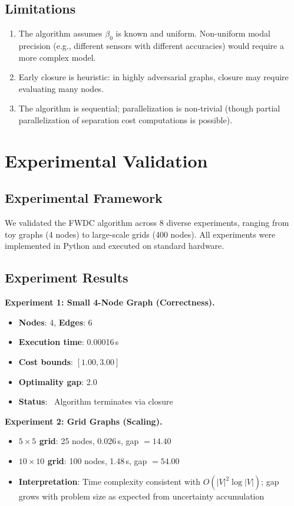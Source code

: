 \documentclass[twocolumn,11pt,a4paper]{article}
\theoremstyle{definition}
\begin{document}
\subsection{Limitations}

\begin{enumerate}
\item The algorithm assumes $\beta_0$ is known and uniform. Non-uniform modal precision (e.g., different sensors with different accuracies) would require a more complex model.
\item Early closure is heuristic: in highly adversarial graphs, closure may require evaluating many nodes.
\item The algorithm is sequential; parallelization is non-trivial (though partial parallelization of separation cost computations is possible).
\end{enumerate}

\section{Experimental Validation}

\subsection{Experimental Framework}

We validated the FWDC algorithm across 8 diverse experiments, ranging from toy graphs (4 nodes) to large-scale grids (400 nodes). All experiments were implemented in Python and executed on standard hardware.

\subsection{Experiment Results}

\textbf{Experiment 1: Small 4-Node Graph (Correctness).}
\begin{itemize}
\item \textbf{Nodes}: 4, \textbf{Edges}: 6
\item \textbf{Execution time}: 0.00016\,s
\item \textbf{Cost bounds}: $[1.00, 3.00]$
\item \textbf{Optimality gap}: 2.0
\item \textbf{Status}: \checkmark~Algorithm terminates via closure
\end{itemize}

\textbf{Experiment 2: Grid Graphs (Scaling).}
\begin{itemize}
\item \textbf{$5 \times 5$ grid}: 25 nodes, 0.026\,s, gap $= 14.40$
\item \textbf{$10 \times 10$ grid}: 100 nodes, 1.48\,s, gap $= 54.00$
\item \textbf{Interpretation}: Time complexity consistent with $O(|V|^2 \log |V|)$; gap grows with problem size as expected from uncertainty accumulation
\end{itemize}
\end{document}
